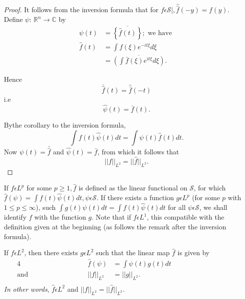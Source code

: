 \begin{proof}
  It follows from the inversion formula that for $f \epsilon
  \mathscr{S} \big|, \hat{\hat{f}} (-y ) = f (y)$. Define $\psi$:
  $\mathbb{R}^n \to \mathbb{C}$ by 
  \begin{align*}
    \psi (t) & = \overline{\left\{ \hat{f} (t) \right\}} ; \text{ we have } \\
    \hat{f} (t) & =\int f (\xi) e^{-it \xi} d \xi\\
    & = \overline{\left(\int \bar f (\xi) e^{it \xi} d \xi\right)}.
  \end{align*}
  
  Hence 
  \begin{equation*}
    \bar{\hat{f}} (t)  = \hat{\bar{f}} (-t)
    \tag{4.2}\label{chap3:sec4:eq4.2}
  \end{equation*}
    i.e
    $$
    \hat{\psi} (t) = \bar{f} (t). 
      $$
  
  By\pageoriginale the corollary to the inversion formula,
  $$
  \int f (t) \hat{\psi} (t) dt = \int \psi (t) \hat{f} (t) dt.
  $$
  Now $\psi (t) = \bar{\hat{f}}$ and $\hat{\psi} (t) = \bar{f}$, from
  which it follows that 
  $$
  ||f||_{L^2} = ||\hat{f}||_{L^2}.
  $$
\end{proof} 

\begin{defi*}%
  If $f \epsilon L^p$ for some $p \ge 1, \hat{f}$ is defined as the
  linear functional on $\mathscr{S}$, for which  $\hat{f} (\psi) =
  \int f (t) \hat{\psi} (t) dt, \psi \epsilon \mathscr{S}$. If
  there exists a function $g \epsilon L^p$ (for some $p$ with $1
  \le p \le \infty$), such $\int g (t) \psi (t) dt = \int f (t)
  \hat{\psi} (t) dt$ for all  $\psi \epsilon \mathscr{S}$, we shall
  identify $f$ with the function $g$. Note that if $f \epsilon
    L^1$, this compatible with the definition given at the beginning
    (as follows the remark after the inversion formula). 
\end{defi*} 

\begin{theorem*}[(Plancherel)]%
  If $f \epsilon L^2$, then there exists $g \epsilon L^2$ such
  that the linear map $\hat{f}$ is given by 
  \begin{alignat*}{4}
    &&\hat{f} (\psi) & = \int \psi (t) g (t) dt \hspace{4cm} \\
    \text{and} &\hspace{3cm}& ||f ||_{L^2} & = ||g||_{L^2}.\\
  \end{alignat*}
  {\em In other words}, $\hat{f} \epsilon L^2$ and $||f||_{L^2} =
  ||\hat{f}||_{L^2}$. 
\end{theorem*}
 
